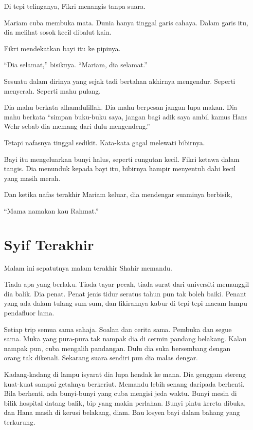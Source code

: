 \documentclass[
  11pt,
  a5paper,
  openany,
  oneside]{book}
\begin{document}
Di tepi telinganya, Fikri menangis tanpa suara.

Mariam cuba membuka mata. Dunia hanya tinggal garis cahaya. Dalam garis
itu, dia melihat sosok kecil dibalut kain.

Fikri mendekatkan bayi itu ke pipinya.

``Dia selamat,'' bisiknya. ``Mariam, dia selamat.''

Sesuatu dalam dirinya yang sejak tadi bertahan akhirnya mengendur.
Seperti menyerah. Seperti mahu pulang.

Dia mahu berkata alhamdulillah. Dia mahu berpesan jangan lupa makan. Dia
mahu berkata ``simpan buku-buku saya, jangan bagi adik saya ambil kamus
Hans Wehr sebab dia memang dari dulu mengendeng.''

Tetapi nafasnya tinggal sedikit. Kata-kata gagal melewati bibirnya.

Bayi itu mengeluarkan bunyi halus, seperti rungutan kecil. Fikri ketawa
dalam tangis. Dia menunduk kepada bayi itu, bibirnya hampir menyentuh
dahi kecil yang masih merah.

Dan ketika nafas terakhir Mariam keluar, dia mendengar suaminya
berbisik,

``Mama namakan kau Rahmat.''

\chapter{Syif Terakhir}\label{syif-terakhir}

Malam ini sepatutnya malam terakhir Shahir memandu.

Tiada apa yang berlaku. Tiada tayar pecah, tiada surat dari universiti
memanggil dia balik. Dia penat. Penat jenis tidur seratus tahun pun tak
boleh baiki. Penant yang ada dalam tulang sum-sum, dan fikirannya kabur
di tepi-tepi macam lampu pendafluor lama.

Setiap trip semua sama sahaja. Soalan dan cerita sama. Pembuka dan segue
sama. Muka yang pura-pura tak nampak dia di cermin pandang belakang.
Kalau nampak pun, cuba mengalih pandangan. Dulu dia suka bersembang
dengan orang tak dikenali. Sekarang suara sendiri pun dia malas dengar.

Kadang-kadang di lampu isyarat dia lupa hendak ke mana. Dia genggam
stereng kuat-kuat sampai getahnya berkeriut. Memandu lebih senang
daripada berhenti. Bila berhenti, ada bunyi-bunyi yang cuba mengisi jeda
waktu. Bunyi mesin di bilik hospital datang balik, bip yang makin
perlahan. Bunyi pintu kereta dibuka, dan Hana masih di kerusi belakang,
diam. Bau losyen bayi dalam bahang yang terkurung.
\end{document}
